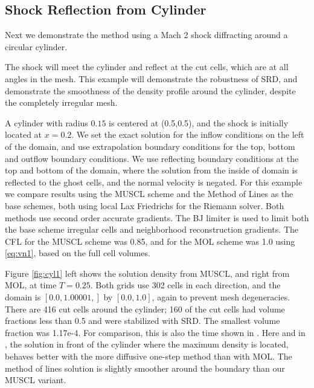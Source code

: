 \subsection{Shock Reflection from  Cylinder}
Next we demonstrate the method using a Mach 2
shock diffracting around a circular cylinder. 

The shock will meet the cylinder and reflect at the cut cells, which are
at all angles in the mesh. This
example will demonstrate the robustness of SRD, and demonstrate the
smoothness of the density profile around the cylinder, despite the
completely irregular mesh.

A cylinder with radius $0.15$ is centered at
(0.5,0.5), and the shock is initially located at $x = 0.2$.
We set the exact solution for the inflow conditions on the left of the
domain, and use extrapolation boundary conditions for the top, bottom
and outflow boundary conditions.  We use reflecting
boundary conditions at the top and bottom of the domain, where the
solution from the inside of domain is reflected to the ghost cells, and
the normal velocity is negated. 
For this example we compare results using the MUSCL scheme and
the Method of Lines as the base schemes, both using local Lax Friedrichs for the Riemann
solver. Both methods use second order accurate gradients. The BJ 
limiter is used to limit
both the base scheme irregular cells  and neighborhood reconstruction gradients. 
The CFL for the MUSCL scheme was 0.85, and for the MOL
scheme was 1.0 using \eqref{eq:vn1}, based on the full cell volumes.

Figure \ref{fig:cyl1} left shows the solution density from MUSCL, and
right from MOL, at time $T=0.25$. 
Both grids use 302 cells in each
direction, and the domain is  $[0.0,1.00001,]$ by  $[0.0, 1.0]$, again to
prevent mesh degeneracies.
There are 416 cut cells
around the cylinder; 160 of the cut cells had volume fractions less than
0.5 and were stabilized with SRD.  The smallest volume fraction was 1.17e-4.   
For comparison, this is also the time shown in \cite{mjb-hel-rjl:hbox2}. 
Here and in \cite{mjb-hel-rjl:hbox2}, the solution in front of the cylinder 
where the
maximum density is located, behaves better with the more diffusive one-step method than with
MOL.  The method of lines solution is slightly smoother around the boundary than our
MUSCL variant. 

